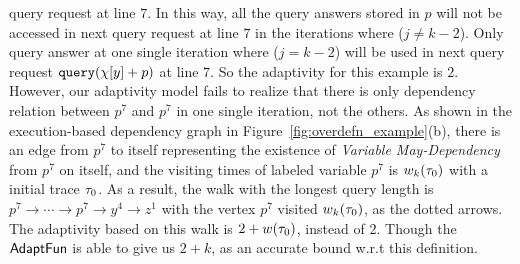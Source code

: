 \begin{example}
    query request at line $7$.
    In this way, all the query answers stored in $p$ will not be accessed in next query request at line $7$ in the iterations 
    where  ($j \neq k - 2$).
    Only query answer at one single iteration where ($j = k - 2 $) will be used in next query request
    ${\tt query}(\chi[y] + p)$ at line $7$.
    So the adaptivity for this example is $2$. 
    However, our adaptivity model fails to realize that there is only dependency relation 
    between $p^7$ and $p^7$ in one single iteration, 
    not the others. 
    As shown in the execution-based dependency graph in Figure~\ref{fig:overdefn_example}(b), 
    there is an edge from $p^7$ to itself representing the existence of \emph{Variable May-Dependency} from $p^7$ on itself,
    and the visiting times of labeled variable $p^7$ is 
    $w_k(\mathtt{\tau}_0)$ with a initial trace $\mathtt{\tau}_0$. 
    As a result, the walk with the longest query length 
    is
    $p^7  \to \cdots \to p^7 \to y^4  \to z^1 $ with the vertex $p^7$ visited $w_k(\mathtt{\tau}_0)$,
    as the dotted arrows. 
    The adaptivity 
    based on
    this walk
    is $2 + w(\mathtt{\tau}_0)$, instead of $2$. 
    Though the $\textsf{AdaptFun}$ is able to give us $2 + k$,  as an accurate bound w.r.t this definition.
    

\end{example}
